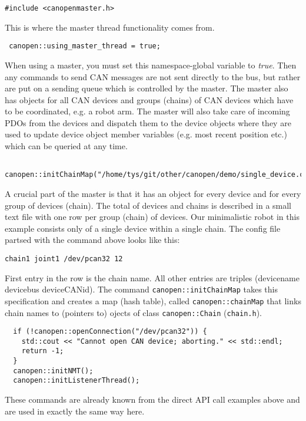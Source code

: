 \begin{verbatim}
#include <canopenmaster.h>
 \end{verbatim}
This is where the master thread functionality comes from.

\begin{verbatim}
 canopen::using_master_thread = true;
 \end{verbatim}
When using a master, you must set this namespace-global variable to {\em true}. Then any commands to send CAN messages are not sent directly to the bus, but rather are put on a sending queue which is controlled by the master. The master also has objects for all CAN devices and groups (chains) of CAN devices which have to be coordinated, e.g. a robot arm. The master will also take care of incoming PDOs from the devices and dispatch them to the device objects where they are used to update device object member variables (e.g. most recent position etc.) which can be queried at any time.

\begin{verbatim}
 canopen::initChainMap("/home/tys/git/other/canopen/demo/single_device.csv");
\end{verbatim}
A crucial part of the master is that it has an object for every device and for every group of devices (chain). The total of devices and chains is described in a small text file with one row per group (chain) of devices. Our minimalistic robot in this example consists only of a single device within a single chain. The config file partsed with the command above looks like this:

\begin{verbatim}
chain1 joint1 /dev/pcan32 12
\end{verbatim}
First entry in the row is the chain name. All other entries are triples (devicename devicebus deviceCANid). The command \texttt{canopen::initChainMap} takes this specification and creates a map (hash table), called \texttt{canopen::chainMap} that links chain names to (pointers to) ojects of class \texttt{canopen::Chain} (\texttt{chain.h}).

\begin{verbatim}
  if (!canopen::openConnection("/dev/pcan32")) {
    std::cout << "Cannot open CAN device; aborting." << std::endl;
    return -1;
  } 
  canopen::initNMT();
  canopen::initListenerThread();
\end{verbatim}
These commands are already known from the direct API call examples above and are used in exactly the same way here.

